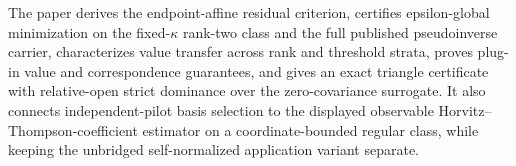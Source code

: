 The paper derives the endpoint-affine residual criterion, certifies epsilon-global minimization on the fixed-\(\kappa\) rank-two class and the full published pseudoinverse carrier, characterizes value transfer across rank and threshold strata, proves plug-in value and correspondence guarantees, and gives an exact triangle certificate with relative-open strict dominance over the zero-covariance surrogate.  It also connects independent-pilot basis selection to the displayed observable Horvitz--Thompson-coefficient estimator on a coordinate-bounded regular class, while keeping the unbridged self-normalized application variant separate.